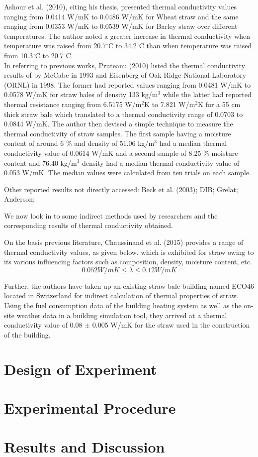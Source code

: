 \documentclass[12pt]{report}
\begin{document}
 Ashour et al. (2010), citing his thesis, presented thermal conductivity
values ranging from 0.0414 W/mK to 0.0486 W/mK for Wheat straw and the
same ranging from 0.0353 W/mK to 0.0539 W/mK for Barley straw over
different temperatures. The author noted a greater increase in thermal
conductivity when temperature was raised from 20.7\(^{\circ}\)C to
34.2\(^{\circ}\)C than when temperature was raised from
10.3\(^{\circ}\)C to 20.7\(^{\circ}\)C.\\

 In referring to previous works, Pruteanu (2010) listed the thermal
conductivity results of by McCabe in 1993 and Eisenberg of Oak Ridge
National Laboratory (ORNL) in 1998. The former had reported values
ranging from 0.0481 W/mK to 0.0578 W/mK for straw bales of density 133
kg/m\(^{3}\) while the latter had reported thermal resistance ranging
from 6.5175 W/m\(^{2}\)K to 7.821 W/m\(^{2}\)K for a 55 cm thick straw
bale which translated to a thermal conductivity range of 0.0703 to
0.0844 W/mK. The author then devised a simple technique to measure the
thermal conductivity of straw samples. The first sample having a
moisture content of around 6 \% and density of 51.06 kg/m\(^{3}\) had a
median thermal conductivity value of 0.0614 W/mK and a second sample of
8.25 \% moisture content and 76.40 kg/m\(^{3}\) density had a median
thermal conductivity value of 0.053 W/mK. The median values were
calculated from ten trials on each sample.

 Other reported results not directly accessed: Beck et al. (2003); DIB;
Grelat; Anderson;

 We now look in to some indirect methods used by researchers and the
corresponding results of thermal conductivity obtained.

 On the basis previous literature, Chaussinand et al. (2015) provides a
range of thermal conductivity values, as given below, which is exhibited
for straw owing to its various influencing factors such as composition,
density, moisture content, etc.\\

\[0.052 W/mK \leq \lambda \leq 0.12 W/mK\]

Further, the authors have taken up an existing straw bale building named
ECO46 located in Switzerland for indirect calculation of thermal
properties of straw. Using the fuel consumption data of the building
heating system as well as the on-site weather data in a building
simulation tool, they arrived at a thermal conductivity value of 0.08
\(\pm\) 0.005 W/mK for the straw used in the construction of the
building.\\


\section*{Design of Experiment}
\section*{Experimental Procedure}
\section*{Results and Discussion}
\end{document}
